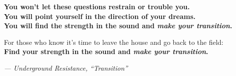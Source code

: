 \begin{center}
\textbf{You won't let these questions restrain or trouble you.}\\
\textbf{You will point yourself in the direction of your dreams.}\\
\textbf{You will find the strength in the sound and \emph{make your transition}.}

\vspace{2.5cm}

For those who know it's time to leave the house and go back to the field:\\[1cm]
{\Large\textbf{Find your strength in the sound and \emph{make your transition}.}}

\end{center}

\vspace{2cm}

\begin{flushright}
\textit{--- Underground Resistance, ``Transition''}
\end{flushright}

\vspace*{\fill}

\newpage
